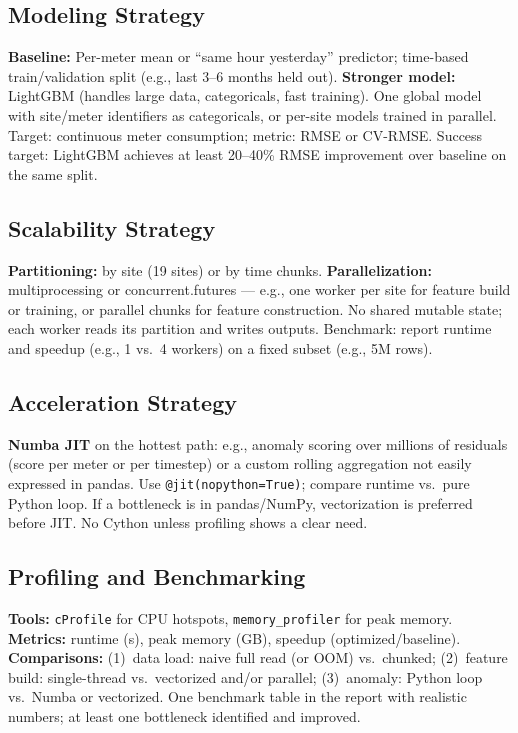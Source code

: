 \documentclass[11pt,a4paper]{article}
\begin{document}
\subsection{Modeling Strategy}
\textbf{Baseline:} Per-meter mean or ``same hour yesterday'' predictor; time-based train/validation split (e.g., last 3--6 months held out). \textbf{Stronger model:} LightGBM (handles large data, categoricals, fast training). One global model with site/meter identifiers as categoricals, or per-site models trained in parallel. Target: continuous meter consumption; metric: RMSE or CV-RMSE. Success target: LightGBM achieves at least 20--40\% RMSE improvement over baseline on the same split.

\subsection{Scalability Strategy}
\textbf{Partitioning:} by site (19 sites) or by time chunks. \textbf{Parallelization:} multiprocessing or concurrent.futures --- e.g., one worker per site for feature build or training, or parallel chunks for feature construction. No shared mutable state; each worker reads its partition and writes outputs. Benchmark: report runtime and speedup (e.g., 1 vs.\ 4 workers) on a fixed subset (e.g., 5M rows).

\subsection{Acceleration Strategy}
\textbf{Numba JIT} on the hottest path: e.g., anomaly scoring over millions of residuals (score per meter or per timestep) or a custom rolling aggregation not easily expressed in pandas. Use \texttt{@jit(nopython=True)}; compare runtime vs.\ pure Python loop. If a bottleneck is in pandas/NumPy, vectorization is preferred before JIT. No Cython unless profiling shows a clear need.

\subsection{Profiling and Benchmarking}
\textbf{Tools:} \texttt{cProfile} for CPU hotspots, \texttt{memory\_profiler} for peak memory. \textbf{Metrics:} runtime (s), peak memory (GB), speedup (optimized/baseline). \textbf{Comparisons:} (1)~data load: naive full read (or OOM) vs.\ chunked; (2)~feature build: single-thread vs.\ vectorized and/or parallel; (3)~anomaly: Python loop vs.\ Numba or vectorized. One benchmark table in the report with realistic numbers; at least one bottleneck identified and improved.
\end{document}
